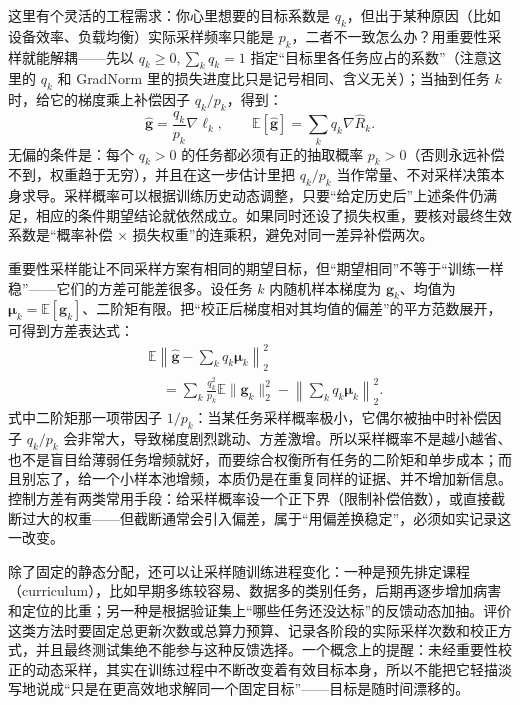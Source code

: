这里有个灵活的工程需求：你心里想要的目标系数是 $q_k$，但出于某种原因（比如设备效率、负载均衡）实际采样频率只能是 $p_k$，二者不一致怎么办？用重要性采样就能解耦——先以 $q_k\geq0,\sum_kq_k=1$ 指定“目标里各任务应占的系数”（注意这里的 $q_k$ 和 GradNorm 里的损失进度比只是记号相同、含义无关）；当抽到任务 $k$ 时，给它的梯度乘上补偿因子 $q_k/p_k$，得到：
\begin{equation}
  \widehat{\bm g}
  =\frac{q_k}{p_k}\nabla\ell_k,
  \qquad
  \mathbb E[\widehat{\bm g}]
  =\sum_kq_k\nabla\hat R_k.
  \label{eq:ket-sharing-importance-sampling}
\end{equation}
无偏的条件是：每个 $q_k>0$ 的任务都必须有正的抽取概率 $p_k>0$（否则永远补偿不到，权重趋于无穷），并且在这一步估计里把 $q_k/p_k$ 当作常量、不对采样决策本身求导。采样概率可以根据训练历史动态调整，只要“给定历史后”上述条件仍满足，相应的条件期望结论就依然成立。如果同时还设了损失权重，要核对最终生效系数是“概率补偿 × 损失权重”的连乘积，避免对同一差异补偿两次。

重要性采样能让不同采样方案有相同的期望目标，但“期望相同”不等于“训练一样稳”——它们的方差可能差很多。设任务 $k$ 内随机样本梯度为 $\bm g_k$、均值为 $\bm\mu_k=\mathbb E[\bm g_k]$、二阶矩有限。把“校正后梯度相对其均值的偏差”的平方范数展开，可得到方差表达式：
\begin{align}
  &\mathbb E\left\|
    \widehat{\bm g}-\sum_kq_k\bm\mu_k
  \right\|_2^2
  \nonumber\\
  &\quad=
  \sum_k\frac{q_k^2}{p_k}\mathbb E\|\bm g_k\|_2^2
  -\left\|\sum_kq_k\bm\mu_k\right\|_2^2.
  \label{eq:ket-sharing-sampling-variance}
\end{align}
式中二阶矩那一项带因子 $1/p_k$：当某任务采样概率极小，它偶尔被抽中时补偿因子 $q_k/p_k$ 会非常大，导致梯度剧烈跳动、方差激增。所以采样概率不是越小越省、也不是盲目给薄弱任务增频就好，而要综合权衡所有任务的二阶矩和单步成本；而且别忘了，给一个小样本池增频，本质仍是在重复同样的证据、并不增加新信息。控制方差有两类常用手段：给采样概率设一个正下界（限制补偿倍数），或直接截断过大的权重——但截断通常会引入偏差，属于“用偏差换稳定”，必须如实记录这一改变。

除了固定的静态分配，还可以让采样随训练进程变化：一种是预先排定课程（curriculum），比如早期多练较容易、数据多的类别任务，后期再逐步增加病害和定位的比重；另一种是根据验证集上“哪些任务还没达标”的反馈动态加抽。评价这类方法时要固定总更新次数或总算力预算、记录各阶段的实际采样次数和校正方式，并且最终测试集绝不能参与这种反馈选择。一个概念上的提醒：未经重要性校正的动态采样，其实在训练过程中不断改变着有效目标本身，所以不能把它轻描淡写地说成“只是在更高效地求解同一个固定目标”——目标是随时间漂移的。

